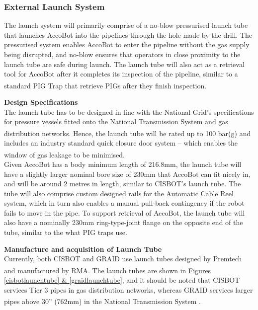 \documentclass[11pt]{article}		%
\newcommand{\supercite}[1]{\textsuperscript{\cite{#1}}}		%
\begin{document}
		\subsubsection{External Launch System}
	    The launch system will primarily comprise of a no-blow pressurised launch tube that launches AccoBot into the pipelines through the hole made by the drill. The pressurised system enables AccoBot to enter the pipeline without the gas supply being disrupted, and no-blow ensures that operators in close proximity to the launch tube are safe during launch. The launch tube will also act as a retrieval tool for AccoBot after it completes its inspection of the pipeline, similar to a standard PIG Trap that retrieve PIGs after they finish inspection\supercite{pigtrap}. 

    \textbf{Design Specifications}
    \\The launch tube has to be designed in line with the National Grid’s specifications for pressure vessels fitted onto the National Transmission System and gas distribution networks\supercite{NTSstandards}. Hence, the launch tube will be rated up to 100 bar(g) and includes an industry standard quick closure door system – which enables the window of gas leakage to be minimised\supercite{launchtubestandards}.
    \\ \hspace*{3ex}Given AccoBot has a body minimum length of 216.8mm, the launch tube will have a slightly larger nominal bore size of 230mm that AccoBot can fit nicely in, and will be around 2 metres in length, similar to CISBOT’s launch tube. The tube will also comprise custom designed rails for the Automatic Cable Reel system, which in turn also enables a manual pull-back contingency if the robot fails to move in the pipe. To support retrieval of AccoBot, the launch tube will also have a nominally 230mm ring-type-joint flange on the opposite end of the tube, similar to the what PIG traps use. 

    \textbf{Manufacture and acquisition of Launch Tube}
    \\Currently, both CISBOT and GRAID use launch tubes designed by Premtech and manufactured by RMA\supercite{launchtubemfg}.  The launch tubes are shown in \hyperref[cisbotlaunchtube]{Figures \ref*{cisbotlaunchtube} \& \ref*{graidlaunchtube}}, and it should be noted that CISBOT services Tier 3 pipes in gas distribution networks, whereas GRAID services larger pipes above 30” (762mm) in the National Transmission System \supercite{GRAID}. 
\end{document}
